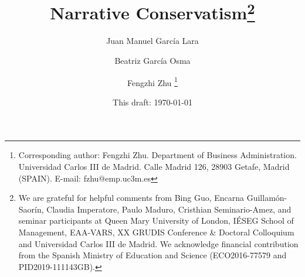 \documentclass[letterpaper,12pt]{article}
\begin{document}
	
	\title{\textbf{Narrative Conservatism}\footnote{We are grateful for helpful comments from Bing Guo, Encarna Guillam\'on-Saor\'in, Claudia Imperatore, Paulo Maduro, Cristhian Seminario-Amez, and seminar participants at Queen Mary University of London, IÉSEG School of Management, EAA-VARS, XX GRUDIS Conference \& Doctoral Colloquium and Universidad Carlos III de Madrid. We acknowledge financial contribution from the Spanish Ministry of Education and Science (ECO2016-77579 and PID2019-111143GB).}}
		
	\author{\normalsize \vspace{1cm}Juan Manuel Garc\'ia Lara}
	
	\author{Beatriz Garc\'ia Osma}
	
	\author{Fengzhi Zhu%
		\thanks{Corresponding author: Fengzhi Zhu. Department of Business Administration. Universidad Carlos III de Madrid. Calle Madrid 126, 28903 Getafe, Madrid (SPAIN). E-mail: fzhu@emp.uc3m.es}}
	
	
	\date{\small This draft: \today}
	
	\maketitle
	
\end{document}

